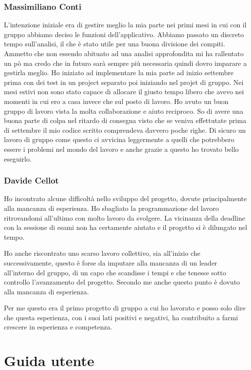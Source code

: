 \documentclass[a4paper,12pt]{report}
\begin{document}
\subsection*{Massimiliano Conti}
L'intenzione iniziale era di gestire meglio la mia parte nei primi mesi in cui con il gruppo
abbiamo deciso le funzioni dell'applicativo. Abbiamo passato un discreto tempo sull'analisi,
il che è stato utile per una buona divisione dei compiti. Ammetto che non essendo abituato ad
una analisi approfondita mi ha rallentato un pò ma credo che in futuro sarà sempre più necessaria
quindi dovro imparare a gestirla meglio. Ho iniziato ad implementare la mia parte ad inizio
settembre prima con dei test in un project separato poi iniziando nel projet di gruppo.
Nei mesi estivi non sono stato capace di allocare il giusto tempo libero che avevo nei momenti
in cui ero a casa invece che sul posto di lavoro.
Ho avuto un buon gruppo di lavoro vista la molta collaborazione e aiuto reciproco.
So di avere una buona parte di colpa nel ritardo di consegna visto che se veniva effettutate
prima di settembre il mio codice scritto comprendeva davvero poche righe.
Di sicuro un lavoro di gruppo come questo ci avvicina leggermente a quelli che potrebbero
essere i problemi nel mondo del lavoro e anche grazie a questo ho trovato bello eseguirlo.

\subsection*{Davide Cellot}
Ho incontrato alcune difficoltà nello sviluppo del progetto, dovute principalmente alla mancanza di esperienza. Ho sbagliato la programmazione del lavoro ritrovandomi all’ultimo con molto lavoro da svolgere. La vicinanza della deadline con la sessione di esami non ha certamente aiutato e il progetto si è dilungato nel tempo.

Ho anche riscontrato uno scarso lavoro collettivo, sia all’inizio che successivamente, questo è forse da imputare alla mancanza di un leader all’interno del gruppo, di un capo che scandisse i tempi e che tenesse sotto controllo l’avanzamento del progetto. Secondo me anche questo punto è dovuto alla mancanza di esperienza.

Per me questo era il primo progetto di gruppo a cui ho lavorato e posso solo dire che questa esperienza, con i suoi lati positivi e negativi, ha contribuito a farmi crescere in esperienza e competenza.


\appendix
\chapter{Guida utente}
\end{document}
